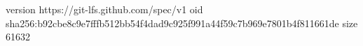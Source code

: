 version https://git-lfs.github.com/spec/v1
oid sha256:b92cbe8c9e7fffb512bb54f4dad9c925f991a44f59c7b969e7801b4f811661de
size 61632
